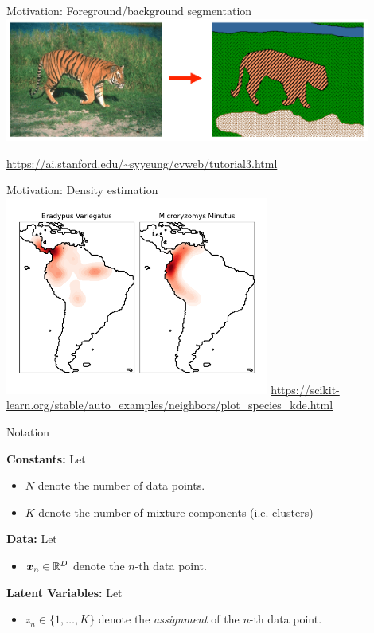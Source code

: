 \documentclass[aspectratio=169]{beamer}
\begin{document}
\begin{frame}{Motivation: Foreground/background segmentation}
\centering
\includegraphics[width=0.9\textwidth]{figures/lap4/segmentation.png}

{\footnotesize \url{https://ai.stanford.edu/~syyeung/cvweb/tutorial3.html}}
\end{frame}

\begin{frame}{Motivation: Density estimation}
\centering
\includegraphics[width=0.65\textwidth]{figures/lap4/sphx_glr_plot_species_kde_001.png}
{\footnotesize \url{https://scikit-learn.org/stable/auto_examples/neighbors/plot_species_kde.html}}
\end{frame}

\begin{frame}{Notation}
    
\textbf{Constants: } Let
\begin{itemize}
    \item $N$ denote the number of data points.
    \item $K$ denote the number of mixture components (i.e. clusters)
\end{itemize}

\textbf{Data:} Let
\begin{itemize}
    \item $\boldsymbol{x}_n \in \mathbb{R}^D$ denote the $n$-th data point.
\end{itemize}

\textbf{Latent Variables:} Let
\begin{itemize}
    \item $z_n \in \{1, \ldots, K\}$ denote the \textit{assignment} of the $n$-th data point.
\end{itemize}
\end{frame}
\end{document}
